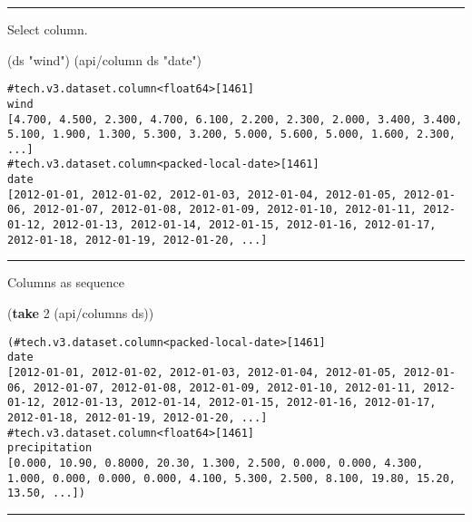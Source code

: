 \documentclass[]{article}
\newenvironment{Shaded}{\begin{snugshade}}{\end{snugshade}}
\newcommand{\DecValTok}[1]{\textcolor[rgb]{0.00,0.00,0.81}{#1}}
\newcommand{\KeywordTok}[1]{\textcolor[rgb]{0.13,0.29,0.53}{\textbf{#1}}}
\newcommand{\NormalTok}[1]{#1}
\newcommand{\StringTok}[1]{\textcolor[rgb]{0.31,0.60,0.02}{#1}}
\begin{document}
\begin{center}\rule{0.5\linewidth}{0.5pt}\end{center}

Select column.

\begin{Shaded}
\begin{Highlighting}[]
\NormalTok{(ds }\StringTok{"wind"}\NormalTok{)}
\NormalTok{(api/column ds }\StringTok{"date"}\NormalTok{)}
\end{Highlighting}
\end{Shaded}

\begin{verbatim}
#tech.v3.dataset.column<float64>[1461]
wind
[4.700, 4.500, 2.300, 4.700, 6.100, 2.200, 2.300, 2.000, 3.400, 3.400, 5.100, 1.900, 1.300, 5.300, 3.200, 5.000, 5.600, 5.000, 1.600, 2.300, ...]
#tech.v3.dataset.column<packed-local-date>[1461]
date
[2012-01-01, 2012-01-02, 2012-01-03, 2012-01-04, 2012-01-05, 2012-01-06, 2012-01-07, 2012-01-08, 2012-01-09, 2012-01-10, 2012-01-11, 2012-01-12, 2012-01-13, 2012-01-14, 2012-01-15, 2012-01-16, 2012-01-17, 2012-01-18, 2012-01-19, 2012-01-20, ...]
\end{verbatim}

\begin{center}\rule{0.5\linewidth}{0.5pt}\end{center}

Columns as sequence

\begin{Shaded}
\begin{Highlighting}[]
\NormalTok{(}\KeywordTok{take} \DecValTok{2}\NormalTok{ (api/columns ds))}
\end{Highlighting}
\end{Shaded}

\begin{verbatim}
(#tech.v3.dataset.column<packed-local-date>[1461]
date
[2012-01-01, 2012-01-02, 2012-01-03, 2012-01-04, 2012-01-05, 2012-01-06, 2012-01-07, 2012-01-08, 2012-01-09, 2012-01-10, 2012-01-11, 2012-01-12, 2012-01-13, 2012-01-14, 2012-01-15, 2012-01-16, 2012-01-17, 2012-01-18, 2012-01-19, 2012-01-20, ...] #tech.v3.dataset.column<float64>[1461]
precipitation
[0.000, 10.90, 0.8000, 20.30, 1.300, 2.500, 0.000, 0.000, 4.300, 1.000, 0.000, 0.000, 0.000, 4.100, 5.300, 2.500, 8.100, 19.80, 15.20, 13.50, ...])
\end{verbatim}

\begin{center}\rule{0.5\linewidth}{0.5pt}\end{center}
\end{document}
